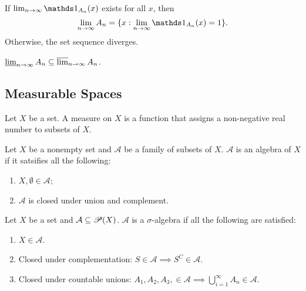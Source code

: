 \documentclass[class=book, crop=false]{standalone}
\begin{document}
        \begin{corollary}
            If $\lim_{n \rightarrow \infty} \indic_{A_n}(x)$ exists for all $x$, then
            \begin{equation*}
                \lim_{n \rightarrow \infty} A_n = \{x : \lim_{n \rightarrow \infty} \indic_{A_n}(x) = 1\}.
            \end{equation*}
            Otherwise, the set sequence diverges.
        \end{corollary}
        
        \begin{theorem}
            $\varliminf_{n \rightarrow \infty} A_n \subseteq \varlimsup_{n \rightarrow \infty} A_n$.
        \end{theorem}


        \subsection{Measurable Spaces}
        \begin{definition}[Measure]
            Let $X$ be a set. A measure on $X$ is a function that assigns a non-negative real number to subsets of $X$.
        \end{definition}

        \begin{definition}[Algebra]
            Let $X$ be a nonempty set and $\mathscr{A}$ be a family of subsets of $X$. $\mathscr{A}$ is an algebra of $X$ if it satsifies all the following:
            \begin{enumerate}
                \item $X, \emptyset \in \mathscr{A}$;
                \item $\mathscr{A}$ is closed under union and complement.
            \end{enumerate}
        \end{definition}
        
        \begin{definition} \label{def:sigma-algebra}
            Let $X$ be a set and $\mathcal{A} \subseteq \mathscr{P}(X)$. $\mathcal{A}$ is a $\sigma$-algebra if all the following are satisfied:
            \begin{enumerate}
                \item $X \in \mathcal{A}$.
                \item Closed under complementation: $S \in \mathcal{A} \implies S^C \in \mathcal{A}$.
                \item Closed under countable unions: $A_1, A_2, A_3, \in \mathcal{A} \implies \bigcup^{\infty}_{i = 1} A_n \in \mathcal{A}$.
            \end{enumerate}
        \end{definition}
        
\end{document}

